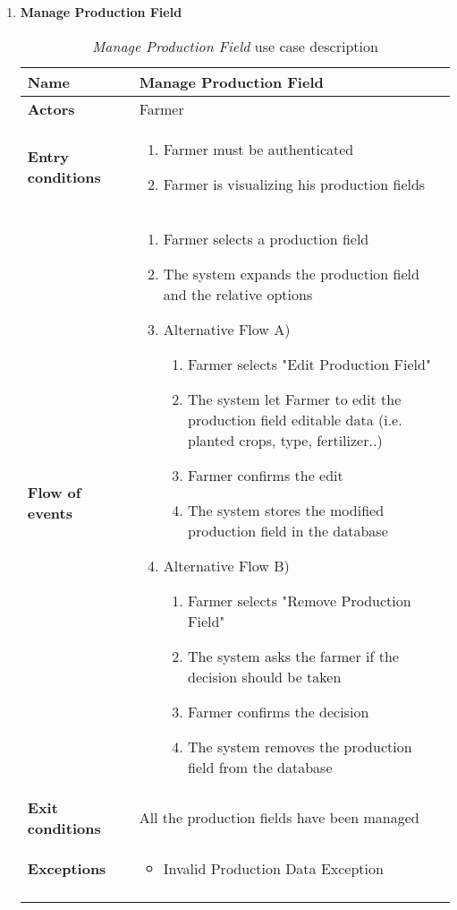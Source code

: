 \begin{enumerate}
				\FloatBarrier
				\newpage
			\item \textbf{Manage Production Field}
				\begin{longtable}{p{0.26\linewidth}p{0.75\linewidth}}
					\toprule
					\textbf{Name} & \textbf{Manage Production Field} \\
					\midrule
					\textbf{Actors} & Farmer \\
					\midrule
					\textbf{Entry conditions} & \begin{enumerate}
													\item Farmer must be authenticated
													\item Farmer is visualizing his production fields
												\end{enumerate}\\
					\midrule
					\textbf{Flow of events} & 
					\begin{enumerate}
						\item Farmer selects a production field
						\item The system expands the production field and the relative options
						\item Alternative Flow A)
						\begin{enumerate}
							\item Farmer selects "Edit Production Field"
							\item The system let Farmer to edit the production field editable data (i.e. planted crops, type, fertilizer..)
							\item Farmer confirms the edit
							\item The system stores the modified production field in the database
						\end{enumerate}
						\item Alternative Flow B)
						\begin{enumerate}
							\item Farmer selects "Remove Production Field"
							\item The system asks the farmer if the decision should be taken
							\item Farmer confirms the decision
							\item The system removes the production field from the database
						\end{enumerate}
					\end{enumerate} \\
					\midrule
					\textbf{Exit conditions} & All the production fields have been managed \\
					\midrule
					\textbf{Exceptions} & 
					\begin{itemize}
						\item Invalid Production Data Exception
					\end{itemize} \\
					\bottomrule
					\caption{\emph{Manage Production Field} use case description}
				\end{longtable}
			

\end{enumerate}
